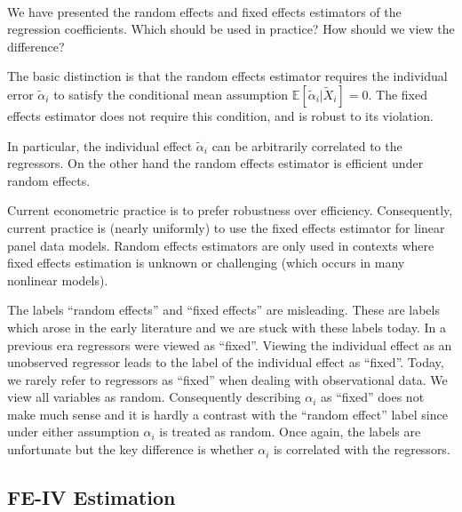 
\begin{remark}
    \

    We have presented the random effects and fixed effects estimators of the regression coefficients.
Which should be used in practice? How should we view the difference?

    The basic distinction is that the random effects estimator requires the individual error $\tilde{\alpha}_i$ 
    to satisfy the conditional mean assumption $\mathbb{E}[\tilde{\alpha}_i | \tilde{X}_i] = 0$.
    The fixed effects estimator does not require this condition, and is robust to its violation. 
    
    In particular, the individual effect $\tilde{\alpha}_i$ can be arbitrarily correlated to the regressors.
    On the other hand the random effects estimator is efficient under random effects.

    Current econometric practice is to prefer robustness over efficiency. 
    Consequently, current practice is (nearly uniformly) to use the fixed effects estimator for linear panel data models. 
    Random effects estimators are only used in contexts where fixed effects estimation is unknown or challenging 
    (which occurs in many nonlinear models).
    
    The labels ``random effects'' and ``fixed effects'' are misleading. 
    These are labels which arose in the early literature and we are stuck with these labels today. 
    In a previous era regressors were viewed as ``fixed''. 
    Viewing the individual effect as an unobserved regressor leads to the label of the individual effect as ``fixed''. 
    Today, we rarely refer to regressors as ``fixed'' when dealing with observational data. 
    We view all variables as random. Consequently describing $\alpha_i$ as ``fixed'' does not make much sense 
    and it is hardly a contrast with the ``random effect'' label since under either assumption $\alpha_i$ is treated as random. 
    Once again, the labels are unfortunate but the key difference is whether $\alpha_i$ is correlated with the regressors.
\end{remark}

\subsection{FE-IV Estimation}


